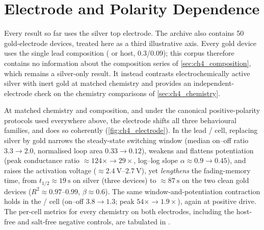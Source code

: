 \documentclass[12pt, twoside]{report}
\begin{document}
\section{Electrode and Polarity Dependence}\label{sec:ch4_electrode}

Every result so far uses the silver top electrode. The archive also contains \num{50} gold-electrode devices, treated here as a third illustrative axis. Every gold device uses the single lead composition (\PEO{} or \TMPE{} host, \num{0.3}/\num{0.09}); this corpus therefore contains no information about the composition series of \cref{sec:ch4_composition}, which remains a silver-only result. It instead contrasts electrochemically active silver with inert gold at matched chemistry and provides an independent-electrode check on the chemistry comparisons of \cref{sec:ch4_chemistry}.

At matched chemistry and composition, and under the canonical positive-polarity protocols used everywhere above, the electrode shifts all three behavioural families, and does so coherently (\cref{fig:ch4_electrode}). In the lead \PEO{}/\LiTf{} cell, replacing silver by gold narrows the steady-state switching window (median on--off ratio \(3.3\to2.0\), normalised loop area \(0.33\to0.12\)), weakens and flattens potentiation (peak conductance ratio \(\approx124\times\to29\times\), log--log slope \(\alpha\approx0.9\to0.45\)), and raises the activation voltage (\(\approx\SIrange{2.4}{2.7}{\volt}\)), yet \emph{lengthens} the fading-memory time, from \(t_{1/2}\approx\SI{19}{\second}\) on silver (three devices) to \(\approx\SI{87}{\second}\) on the two clean gold devices (\(R^2\approx0.97\text{--}0.99\), \(\beta\approx0.6\)). The same window-and-potentiation contraction holds in the \TMPE{}/\LiTf{} cell (on--off \(3.8\to1.3\); peak \(54\times\to1.9\times\)), again at positive drive. The per-cell metrics for every chemistry on both electrodes, including the host-free and salt-free negative controls, are tabulated in .
\end{document}
